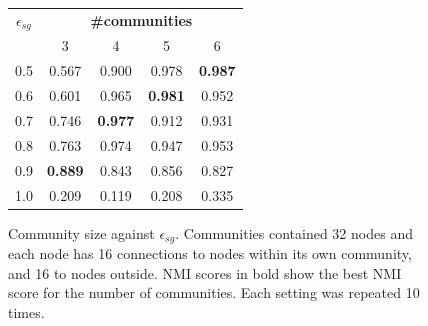 \documentclass{article}
\begin{document}

\begin{figure}
\centering
\begin{tabular}{c c c c c}
\toprule
$\epsilon_{sg}$ & \multicolumn{4}{c}{\textbf{\#communities}} \\
{} & 3 & 4 & 5 & 6 \\
\bottomrule
0.5 & 0.567 & 0.900 & 0.978 & \textbf{0.987} \\
0.6 & 0.601 & 0.965 & \textbf{0.981} & 0.952 \\
0.7 & 0.746 & \textbf{0.977} & 0.912 & 0.931 \\
0.8 & 0.763 & 0.974 & 0.947 & 0.953 \\
0.9 & \textbf{0.889} & 0.843 & 0.856 & 0.827 \\
1.0 & 0.209 & 0.119 & 0.208 & 0.335 \\
\bottomrule
\end{tabular}
\caption{Community size against $\epsilon_{sg}$. Communities contained 32 nodes and each node has 16 connections to nodes within its own community, and 16 to nodes outside. NMI scores in bold show the best NMI score for the number of communities. Each setting was repeated 10 times. }
\label{parameter_experiment}
\end{figure}


\end{document}
